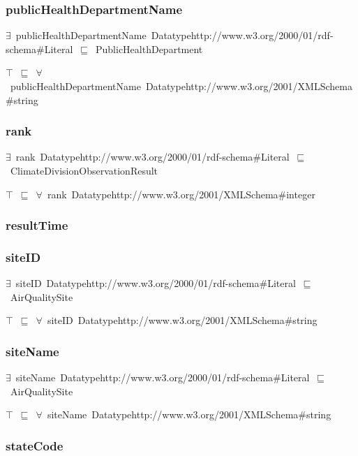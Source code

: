 \documentclass{article}
\begin{document}
\subsubsection*{publicHealthDepartmentName}

\ensuremath{\exists}~publicHealthDepartmentName~Datatypehttp://www.w3.org/2000/01/rdf-schema#Literal~\ensuremath{\sqsubseteq}~PublicHealthDepartment

\ensuremath{\top}~\ensuremath{\sqsubseteq}~\ensuremath{\forall}~publicHealthDepartmentName~Datatypehttp://www.w3.org/2001/XMLSchema#string

\subsubsection*{rank}

\ensuremath{\exists}~rank~Datatypehttp://www.w3.org/2000/01/rdf-schema#Literal~\ensuremath{\sqsubseteq}~ClimateDivisionObservationResult

\ensuremath{\top}~\ensuremath{\sqsubseteq}~\ensuremath{\forall}~rank~Datatypehttp://www.w3.org/2001/XMLSchema#integer

\subsubsection*{resultTime}

\subsubsection*{siteID}

\ensuremath{\exists}~siteID~Datatypehttp://www.w3.org/2000/01/rdf-schema#Literal~\ensuremath{\sqsubseteq}~AirQualitySite

\ensuremath{\top}~\ensuremath{\sqsubseteq}~\ensuremath{\forall}~siteID~Datatypehttp://www.w3.org/2001/XMLSchema#string

\subsubsection*{siteName}

\ensuremath{\exists}~siteName~Datatypehttp://www.w3.org/2000/01/rdf-schema#Literal~\ensuremath{\sqsubseteq}~AirQualitySite

\ensuremath{\top}~\ensuremath{\sqsubseteq}~\ensuremath{\forall}~siteName~Datatypehttp://www.w3.org/2001/XMLSchema#string

\subsubsection*{stateCode}
\end{document}
